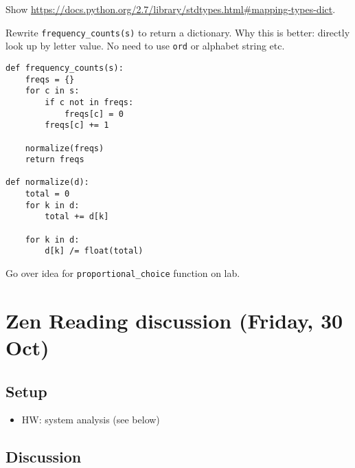 \documentclass{article}
\begin{document}
Show
\url{https://docs.python.org/2.7/library/stdtypes.html#mapping-types-dict}.

Rewrite \verb|frequency_counts(s)| to return a dictionary.  Why this is
better: directly look up by letter value.  No need to use \verb|ord|
or alphabet string etc.

\begin{verbatim}
def frequency_counts(s):
    freqs = {}
    for c in s:
        if c not in freqs:
            freqs[c] = 0
        freqs[c] += 1

    normalize(freqs)
    return freqs

def normalize(d):
    total = 0
    for k in d:
        total += d[k]

    for k in d:
        d[k] /= float(total)
\end{verbatim}
Go over idea for \verb|proportional_choice| function on lab.

\section*{Zen Reading discussion (Friday, 30 Oct)}

\subsection*{Setup}

\begin{itemize}
\item HW: system analysis (see below)
\end{itemize}

\subsection*{Discussion}
\end{document}
